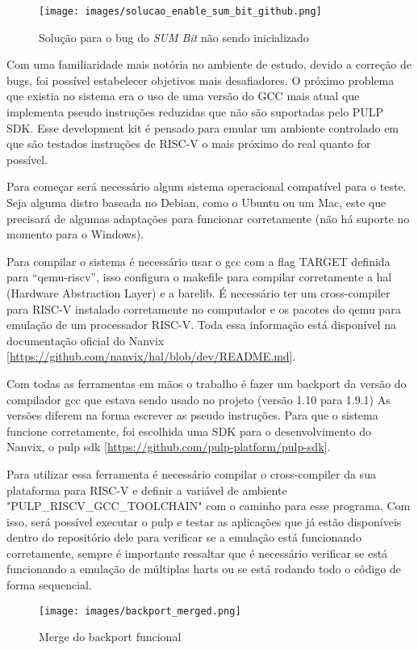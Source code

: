\begin{figure}[h!]
    \centering
    \texttt{[image: images/solucao\_enable\_sum\_bit\_github.png]}
    \caption{Solução para o bug do \emph{SUM Bit} não sendo inicializado \\ \cite{SolucaoEnableSUMBit}}
\end{figure}

Com uma familiaridade mais notória no ambiente de estudo, devido a correção de bugs, foi possível estabelecer objetivos mais desafiadores. O próximo problema que existia no sistema era o uso de uma versão do GCC mais atual que implementa pseudo instruções reduzidas que não são suportadas pelo PULP SDK. Esse development kit é pensado para emular um ambiente controlado em que são testados instruções de RISC-V o mais próximo do real quanto for possível. 

Para começar será necessário algum sistema operacional compatível para o teste. Seja alguma distro baseada no Debian, como o Ubuntu ou um Mac, este que precisará de algumas adaptações para funcionar corretamente (não há suporte no momento para o Windows). 

Para compilar o sistema é necessário usar o gcc com a flag TARGET definida para “qemu-riscv”, isso configura o makefile para compilar corretamente a hal (Hardware Abstraction Layer) e a barelib. É necessário ter um cross-compiler para RISC-V instalado corretamente no computador e os pacotes do qemu para emulação de um processador RISC-V. Toda essa informação está disponível na documentação oficial do Nanvix [\url{https://github.com/nanvix/hal/blob/dev/README.md}]. 

Com todas as ferramentas em mãos o trabalho é fazer um backport da versão do compilador gcc que estava sendo usado no projeto (versão 1.10 para 1.9.1) As versões diferem na forma escrever as pseudo instruções. Para que o sistema funcione corretamente, foi escolhida uma SDK para o desenvolvimento do Nanvix, o pulp sdk [\url{https://github.com/pulp-platform/pulp-sdk}].
  
Para utilizar essa ferramenta é necessário compilar o cross-compiler da sua plataforma para RISC-V e definir a variável de ambiente "PULP\_RISCV\_GCC\_TOOLCHAIN" com o caminho para esse programa. Com isso, será possível executar o pulp e testar as aplicações que já estão disponíveis dentro do repositório dele para verificar se a emulação está funcionando corretamente, sempre é importante ressaltar que é necessário verificar se está funcionando a emulação de múltiplas harts ou se está rodando todo o código de forma sequencial.

\begin{figure}[h!]
    \centering
    \texttt{[image: images/backport\_merged.png]}
    \caption{Merge do backport funcional \\ \cite{SolucaoEnableSUMBit}} %
\end{figure}